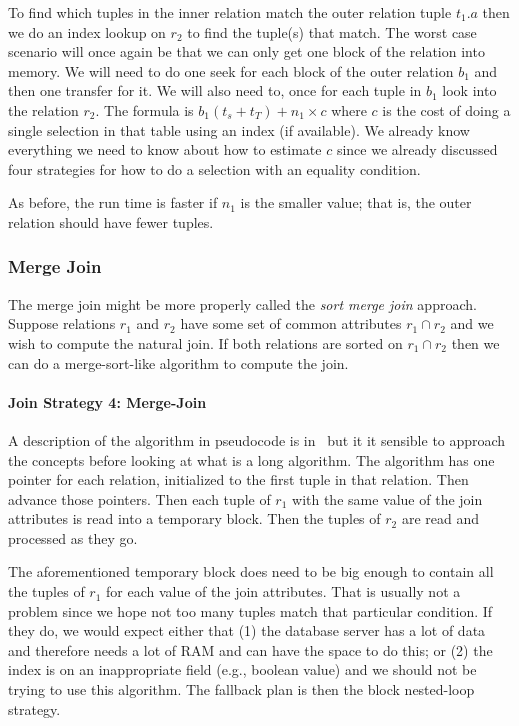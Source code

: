 To find which tuples in the inner relation match the outer relation tuple $t_{1}.a$ then we do an index lookup on $r_{2}$ to find the tuple(s) that match. The worst case scenario will once again be that we can only get one block of the relation into memory. We will need to do one seek for each block of the outer relation $b_{1}$ and then one transfer for it. We will also need to, once for each tuple in $b_{1}$ look into the relation $r_{2}$. The formula is $b_{1} ( t_{s} + t_{T} ) + n_{1} \times c$  where $c$ is the cost of doing a single selection in that table using an index (if available). We already know everything we need to know about how to estimate $c$ since we already discussed four strategies for how to do a selection with an equality condition.

As before, the run time is faster if $n_{1}$ is the smaller value; that is, the outer relation should have fewer tuples. 

\subsubsection*{Merge Join}
The merge join might be more properly called the \textit{sort merge join} approach. Suppose relations $r_{1}$ and $r_{2}$ have some set of common attributes $r_{1} \cap r_{2}$ and we wish to compute the natural join. If both relations are sorted on  $r_{1} \cap r_{2}$ then we can do a merge-sort-like algorithm to compute the join.

\paragraph{Join Strategy 4: Merge-Join}
A description of the algorithm in pseudocode is in~\cite{dsc} but it it sensible to approach the concepts before looking at what is a long algorithm. The algorithm has one pointer for each relation, initialized to the first tuple in that relation. Then advance those pointers. Then each tuple of $r_{1}$ with the same value of the join attributes is read into a temporary block. Then the tuples of $r_{2}$ are read and processed as they go.

The aforementioned temporary block does need to be big enough to contain all the tuples of $r_{1}$ for each value of the join attributes. That is usually not a problem since we hope not too many tuples match that particular condition. If they do, we would expect either that (1) the database server has a lot of data and therefore needs a lot of RAM and can have the space to do this; or (2) the index is on an inappropriate field (e.g., boolean value) and we should not be trying to use this algorithm. The fallback plan is then the block nested-loop strategy.

